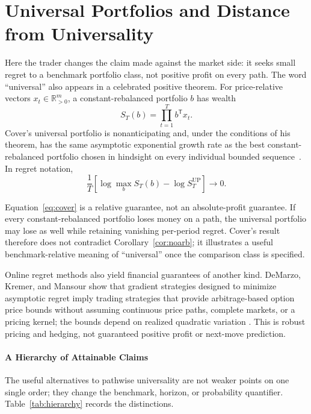 \documentclass[aps,pra,reprint,superscriptaddress,amsmath,amssymb,floatfix]{revtex4-2}
\theoremstyle{plain}
\theoremstyle{definition}
\theoremstyle{remark}
\begin{document}
\section{Universal Portfolios and Distance from Universality}
\label{sec:cover}

Here the trader changes the claim made against the market side: it seeks small
regret to a benchmark portfolio class, not positive profit on every path. The
word ``universal'' also appears in a celebrated positive theorem.
For price-relative vectors \(x_t\in\mathbb{R}_{>0}^m\), a constant-rebalanced
portfolio \(b\) has wealth
\[
  S_T(b)=\prod_{t=1}^T b^\mathsf{T}x_t.
\]
Cover's universal portfolio is nonanticipating and, under the conditions of
his theorem, has the same asymptotic exponential growth rate as the best
constant-rebalanced portfolio chosen in hindsight on every individual bounded
sequence~\cite{Cover1991}. In regret notation,
\begin{equation}
  \frac1T\left[
  \log\max_{b}S_T(b)-\log S_T^{\mathrm{UP}}
  \right]\longrightarrow0.
  \label{eq:cover}
\end{equation}

Equation~\eqref{eq:cover} is a relative guarantee, not an absolute-profit
guarantee. If every constant-rebalanced portfolio loses money on a path, the
universal portfolio may lose as well while retaining vanishing per-period
regret. Cover's result therefore does not contradict
Corollary~\ref{cor:noarb}; it illustrates a useful benchmark-relative meaning
of ``universal'' once the comparison class is specified.

Online regret methods also yield financial guarantees of another kind.
DeMarzo, Kremer, and Mansour show that gradient strategies designed to
minimize asymptotic regret imply trading strategies that provide
arbitrage-based option price bounds without assuming continuous price paths,
complete markets, or a pricing kernel; the bounds depend on realized quadratic
variation
\cite{DeMarzoKremerMansour2016}. This is robust pricing and hedging, not
guaranteed positive profit or next-move prediction.

\paragraph{A Hierarchy of Attainable Claims}

The useful alternatives to pathwise universality are not weaker points on one
single order; they change the benchmark, horizon, or probability quantifier.
Table~\ref{tab:hierarchy} records the distinctions.
\end{document}
